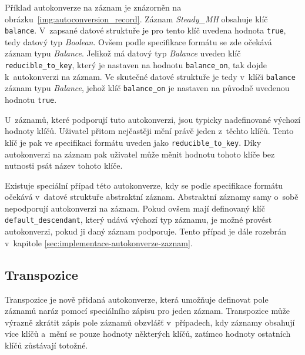 \documentclass[FM,bw,DP]{tulthesis}
\begin{document}
Příklad autokonverze na záznam je znázorněn na obrázku~\ref{img:autoconversion_record}. Záznam \textit{Steady\_MH} obsahuje klíč \texttt{balance}. V~zapsané datové struktuře je pro tento klíč uvedena hodnota \texttt{true}, tedy datový typ \textit{Boolean}. Ovšem podle specifikace formátu se zde očekává záznam typu \textit{Balance}. Jelikož má datový typ \textit{Balance} uveden klíč \texttt{reducible\_to\_key}, který je nastaven na hodnotu \texttt{balance\_on}, tak dojde k~autokonverzi na záznam. Ve skutečné datové struktuře je tedy v~klíči \texttt{balance} záznam typu \textit{Balance}, jehož klíč \texttt{balance\_on} je nastaven na původně uvedenou hodnotu \texttt{true}.

U~záznamů, které podporují tuto autokonverzi, jsou typicky nadefinované výchozí hodnoty klíčů. Uživatel přitom nejčastěji mění právě jeden z~těchto klíčů. Tento klíč je pak ve specifikaci formátu uveden jako \texttt{reducible\_to\_key}. Díky autokonverzi na záznam pak uživatel může měnit hodnotu tohoto klíče bez nutnosti psát název tohoto klíče.

Existuje speciální případ této autokonverze, kdy se podle specifikace formátu očekává v~datové struktuře abstraktní záznam. Abstraktní záznamy samy o~sobě nepodporují autokonverzi na záznam. Pokud ovšem mají definovaný klíč \texttt{default\_de\-scend\-ant}, který udává výchozí typ záznamu, je možné provést autokonverzi, pokud ji daný záznam podporuje. Tento případ je dále rozebrán v~kapitole \ref{sec:implementace-autokonverze-zaznam}.

\subsection{Transpozice}
Transpozice je nově přidaná autokonverze, která umožňuje definovat pole záznamů naráz pomocí speciálního zápisu pro jeden záznam. Transpozice může výrazně zkrátit zápis pole záznamů obzvlášť v~případech, kdy záznamy obsahují více klíčů a~mění se pouze hodnoty některých klíčů, zatímco hodnoty ostatních klíčů zůstávají totožné.
\end{document}
